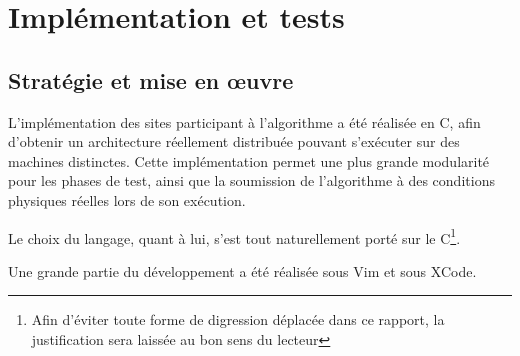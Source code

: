 
\chapter{Implémentation et tests}\label{implementation}

\section{Stratégie et mise en \oe uvre}

L'implémentation des sites participant à l'algorithme a été réalisée en C, afin d'obtenir un
architecture réellement distribuée pouvant s'exécuter sur des machines distinctes. Cette
implémentation permet une plus grande modularité pour les phases de test, ainsi que la soumission de
l'algorithme à des conditions physiques réelles lors de son exécution.

Le choix du langage, quant à lui, s'est tout naturellement porté sur le C\footnote{Afin d'éviter
	toute forme de digression déplacée dans ce rapport, la justification sera laissée au bon sens du
lecteur}. 

Une grande partie du développement a été réalisée sous Vim et sous XCode.

